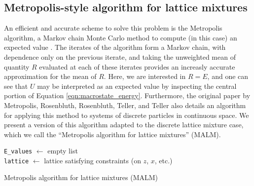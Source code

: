 \documentclass[10pt]{article}
\begin{document}
\subsection{Metropolis-style algorithm for lattice mixtures}
An efficient and accurate scheme to solve this problem is the Metropolis algorithm, a Markov chain Monte Carlo method to compute (in this case) an expected value \cite{md} \cite{metropolis_hastings}.
The iterates of the algorithm form a Markov chain, with dependence only on the previous iterate, and taking the unweighted mean of quantity $R$ evaluated at each of these iterates provides an increasly accurate approximation for the mean of $R$.
Here, we are interested in $R=E$, and one can see that $U$ may be interpreted as an expected value by inspecting the central portion of Equation \ref{eqn:macrostate_energy}.
Furthermore, the original paper by Metropolis, Rosenbluth, Rosenbluth, Teller, and Teller also details an algorithm for applying this method to systems of discrete particles in continuous space.
We present a version of this algorithm adapted to the discrete lattice mixture case, which we call the ``Metropolis algorithm for lattice mixtures'' (MALM).

\begin{algorithm}[H]
    \SetAlgoLined
    \texttt{E\_values} $\gets$ empty list \\
    \texttt{lattice} $\gets$ lattice satisfying constraints (on $z$, $x$, etc.) \\
    \caption{Metropolis algorithm for lattice mixtures (MALM)}
    \label{alg:malm}
\end{algorithm}
\end{document}
